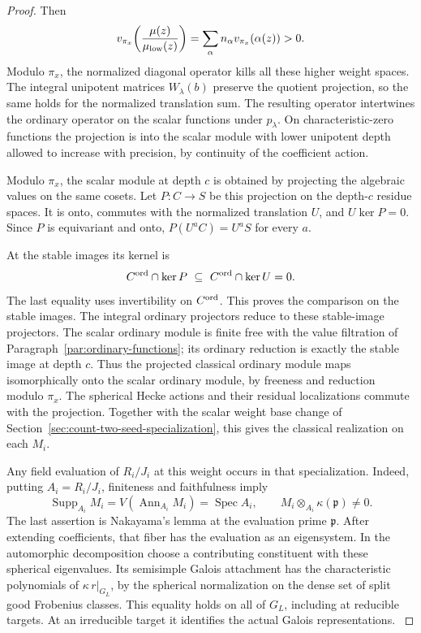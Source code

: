 \begin{proof}
Then
\[
 v_{\pi_x}\!\left(\frac{\mu(z)}{\mu_{\rm low}(z)}\right)
      =\sum_\alpha n_\alpha v_{\pi_x}(\alpha(z))>0.
\]
Modulo \(\pi_x\), the normalized diagonal operator kills all
these higher weight spaces. The integral unipotent matrices
\(W_\lambda(b)\) preserve the quotient projection, so the same
holds for the normalized translation sum. The resulting operator intertwines the
ordinary operator on the scalar functions under \(p_\lambda\).
On characteristic-zero functions the projection is into the
scalar module with lower unipotent depth allowed to increase
with precision, by continuity of the coefficient action.

Modulo \(\pi_x\), the scalar module at depth \(c\) is obtained
by projecting the algebraic values on the same cosets. Let \(P:C\to S\) be this projection on the
depth-\(c\) residue spaces. It is onto, commutes with the
normalized translation \(U\), and \(U\ker P=0\).
Since \(P\) is equivariant and onto, \(P(U^a C)=U^a S\)
for every \(a\).

At the stable images its kernel is
\[
    C^{\rm ord}\cap\ker P \ \subseteq\ C^{\rm ord}\cap\ker U=0 .
\]
The last equality uses invertibility on \(C^{\rm ord}\).
This proves the comparison on the stable images. The integral ordinary projectors reduce
to these stable-image projectors. The scalar ordinary module
is finite free with the value filtration of
Paragraph~\ref{par:ordinary-functions}; its ordinary reduction
is exactly the stable image at depth \(c\). Thus the projected
classical ordinary module maps isomorphically onto the scalar
ordinary module, by freeness and reduction modulo \(\pi_x\).
The spherical Hecke actions and their residual localizations
commute with the projection. Together with the scalar weight
base change of Section~\ref{sec:count-two-seed-specialization},
this gives the classical realization on each \(M_i\).

Any field evaluation of \(R_i/J_i\) at this weight occurs in
that specialization. Indeed, putting \(A_i=R_i/J_i\), finiteness and faithfulness imply
\[
 \operatorname{Supp}_{A_i}M_i=V(\operatorname{Ann}_{A_i}M_i)
 =\operatorname{Spec}A_i,\qquad M_i\otimes_{A_i}\kappa(\mathfrak p)\ne0 .
\]
The last assertion is Nakayama's lemma at the evaluation prime \(\mathfrak p\).
After extending coefficients, that fiber has the evaluation
as an eigensystem. In the automorphic decomposition choose a
contributing constituent with these spherical eigenvalues.
Its semisimple Galois attachment has the characteristic
polynomials of \(\kappa\,r|_{G_L}\), by the spherical
normalization on the dense set of split good Frobenius classes.
This equality holds on all of \(G_L\), including at reducible
targets. At an irreducible target it identifies the actual
Galois representations.
\hfill\mbox{\cite{newton-thorne-unitary}}\label{cor:ordinary-count-ii-point-output-1}

\end{proof}

